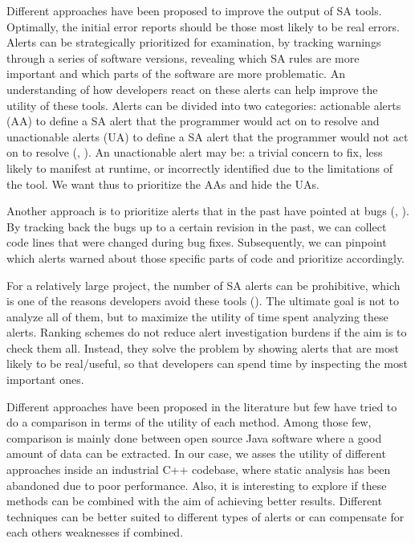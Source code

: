 Different approaches have been proposed to improve the output of SA tools. Optimally, the initial error reports should be those most likely to be real errors. Alerts can be strategically prioritized for examination, by tracking warnings through a series of software versions, revealing which SA rules are more important and which parts of the software are more problematic. 
An understanding of how developers react on these alerts can help improve the utility of these tools. Alerts can be divided into two categories: actionable alerts (AA) to define a SA alert that the programmer would act on to resolve and unactionable alerts (UA) to define a SA alert that the programmer would not act on to resolve (\cite{comparative_heckman}, \cite{actionable_sa}). An unactionable alert may be: a trivial concern to fix, less likely to manifest at runtime, or incorrectly identified due to the limitations of the tool. We want thus to prioritize the AAs and hide the UAs.

Another approach is to prioritize alerts that in the past have pointed at bugs (\cite{which_warnings}, \cite{automatic_training_set}). By tracking back the bugs up to a certain revision in the past, we can collect code lines that were changed during bug fixes. Subsequently, we can pinpoint which alerts warned about those specific parts of code and prioritize accordingly.

For a relatively large project, the number of SA alerts can be prohibitive, which is one of the reasons developers avoid these tools (\cite{why_dont_use}). The ultimate goal is not to analyze all of them, but to maximize the utility of time spent analyzing these alerts. Ranking schemes do not reduce alert investigation burdens if the aim is to check them all. Instead, they solve the problem by showing alerts that are most likely to be real/useful, so that developers can spend time by inspecting the most important ones.

Different approaches have been proposed in the literature but few have tried to do a comparison in terms of the utility of each method. Among those few, comparison is mainly done between open source Java software where a good amount of data can be extracted. In our case, we asses the utility of different approaches inside an industrial C++ codebase, where static analysis has been abandoned due to poor performance. Also, it is interesting to explore if these methods can be combined with the aim of achieving better results. Different techniques can be better suited to different types of alerts or can compensate for each others weaknesses if combined.

